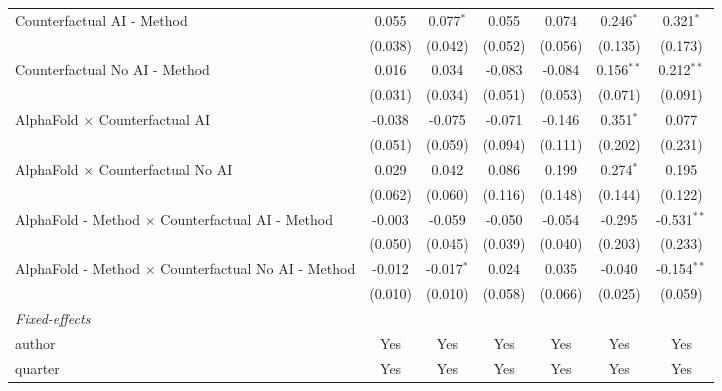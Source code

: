 \begin{tabular}{lcccccc}
   Counterfactual AI - Method                                 & 0.055   & 0.077$^{*}$  & 0.055   & 0.074   & 0.246$^{*}$    & 0.321$^{*}$\\   
                                                              & (0.038) & (0.042)      & (0.052) & (0.056) & (0.135)        & (0.173)\\   
   Counterfactual No AI - Method                              & 0.016   & 0.034        & -0.083  & -0.084  & 0.156$^{**}$   & 0.212$^{**}$\\   
                                                              & (0.031) & (0.034)      & (0.051) & (0.053) & (0.071)        & (0.091)\\   
   AlphaFold $\times$ Counterfactual AI                       & -0.038  & -0.075       & -0.071  & -0.146  & 0.351$^{*}$    & 0.077\\   
                                                              & (0.051) & (0.059)      & (0.094) & (0.111) & (0.202)        & (0.231)\\   
   AlphaFold $\times$ Counterfactual No AI                    & 0.029   & 0.042        & 0.086   & 0.199   & 0.274$^{*}$    & 0.195\\   
                                                              & (0.062) & (0.060)      & (0.116) & (0.148) & (0.144)        & (0.122)\\   
   AlphaFold - Method $\times$ Counterfactual AI - Method     & -0.003  & -0.059       & -0.050  & -0.054  & -0.295         & -0.531$^{**}$\\   
                                                              & (0.050) & (0.045)      & (0.039) & (0.040) & (0.203)        & (0.233)\\   
   AlphaFold - Method $\times$ Counterfactual No AI - Method  & -0.012  & -0.017$^{*}$ & 0.024   & 0.035   & -0.040         & -0.154$^{**}$\\   
                                                              & (0.010) & (0.010)      & (0.058) & (0.066) & (0.025)        & (0.059)\\   
   \midrule
   \emph{Fixed-effects}\\
   author                                                     & Yes     & Yes          & Yes     & Yes     & Yes            & Yes\\  
   quarter                                                    & Yes     & Yes          & Yes     & Yes     & Yes            & Yes\\  
   \midrule

\end{tabular}
